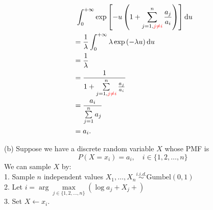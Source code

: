 \begin{homeworkProblem}
\begin{align*}
&\ \int_{0}^{+\infty} \exp\left[- u \left(1 + \sum_{j=1,\textcolor{red}{j\neq i}}^{n} \frac{a_{j}}{a_{i}}\right)\right] \mathrm{d}u \\
&= \dfrac{1}{\lambda} \int_{0}^{+\infty} \lambda\exp\left(- \lambda u\right) \mathrm{d}u \\
&= \dfrac{1}{\lambda} \\
&= \dfrac{1}{1 + \sum\limits_{j=1,\textcolor{red}{j\neq i}}^{n} \frac{a_{j}}{a_{i}}} \\
&= \dfrac{a_{i}}{\sum\limits_{j=1}^{n} a_{j}} \\
&= a_{i}.
\end{align*}

(b) Suppose we have a discrete random variable $X$ whose PMF is
$$P(X = x_i) = a_i,\quad i \in \{1,2,\ldots,n\}$$
We can sample $X$ by: \\
1. Sample $n$ independent values $X_1,\ldots,X_n \stackrel{i.i.d.}{\sim} \text{Gumbel}(0,1)$ \\
2. Let $i = \arg\max\limits_{j \in \{1,2,\dots,n\}} \left( \log a_j + X_j + \right)$ \\
3. Set $X \gets x_i$.

\end{homeworkProblem}

\newpage
